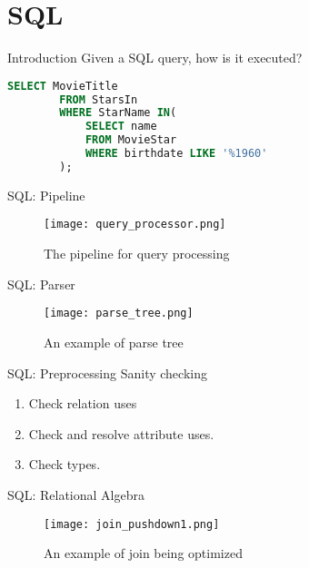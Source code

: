 \section{SQL}
\frame{\sectionpage}


\begin{frame}[fragile]{Introduction}
    Given a SQL query, how is it executed?
    \begin{lstlisting}[language=SQL, caption= SQL query to execute.]
        SELECT MovieTitle
        FROM StarsIn
        WHERE StarName IN(
            SELECT name
            FROM MovieStar
            WHERE birthdate LIKE '%1960'
        );
    \end{lstlisting}
\end{frame}

\begin{frame}{SQL: Pipeline}
    \begin{figure}
        \centering
        \texttt{[image: query\_processor.png]}\\
        \caption{The pipeline for query processing}
        \label{fig:query_processor}
    \end{figure}
\end{frame}

\begin{frame}{SQL: Parser}
    \begin{figure}
        \centering
        \texttt{[image: parse\_tree.png]}\\
        \caption{An example of parse tree}
        \label{fig:prase_tree}
    \end{figure}
\end{frame}

\begin{frame}{SQL: Preprocessing}
    Sanity checking
    \begin{enumerate}
        \item Check relation uses
        \item Check and resolve attribute uses.
        \item Check types.
    \end{enumerate}
\end{frame}

\begin{frame}{SQL: Relational Algebra}
    \begin{figure}
        \centering
        \texttt{[image: join\_pushdown1.png]}\\
        \caption{An example of join being optimized}
        \label{fig:j_1}
    \end{figure}
\end{frame}

